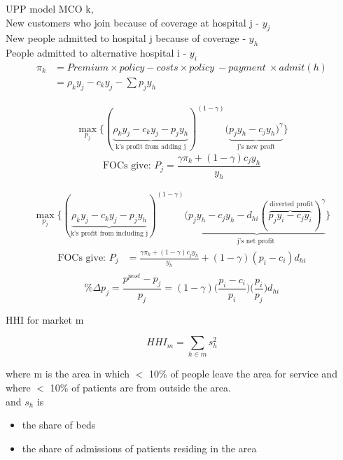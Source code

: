 \documentclass{beamer}
\begin{document}
\begin{frame}{UPP model}
MCO k, \\
New customers who join because of coverage at hospital j - $y_j$ \\
New people admitted to hospital j because of coverage - $y_h$ \\
People admitted to alternative hospital i - $y_i$
\begin{align*}
\pi_k & = Premium \times policy - costs \times policy\  - payment\ \times admit (h) \\
    & = \rho_{k} y_{j} - c_ky_{j} - \sum p_{j} y_{h} 
\end{align*}

\begin{align*}
\max_{p_j} \{ ( \underbrace{ \rho_{k}y_{j} - c_ky_{j} - p_jy_{h}}_{\text{k's profit from adding j}})^{(1-\gamma)}( \underbrace{ p_{j}y_{h}-c_{j}y_{h})^{\gamma} }_{\text{j's new proft}} \}
\end{align*}
\begin{equation*}
\text{FOCs give:    }        P_j = \frac{\gamma \pi_k+(1-\gamma)c_jy_{h}}{y_{h}} 
\end{equation*}
\end{frame}
\begin{frame}

\begin{align*}
    \max_{p_j} \{ ( \underbrace{ \rho_{k}y_{j} - c_ky_{j} - p_jy_{h}}_{\text{k's profit from including j}})^{(1-\gamma)}( \underbrace{ p_{j}y_{h}-c_{j}y_{h} - d_{hi}( \overbrace{p_{j}y_{i}-c_{j}y_{i} }^{\text{ diverted profit}})^{\gamma} }_{\text{j's net profit }} \}
\end{align*}
\begin{align*}
\text{FOCs give:    }        P_j & = \frac{\gamma \pi_k+(1-\gamma)c_jy_{h}} {y_{h}} + (1-\gamma)(p_i - c_i)d_{hi} \\
\end{align*}
$$
\%\Delta p_j = \frac{p^{post} - p_j}{p_j} = (1-\gamma)\bigg( \frac{p_i-c_i}{p_i} \bigg) \bigg( \frac{p_i}{p_j} \bigg) d_{hi}
$$
\end{frame}
\begin{frame}{HHI}
for market m 

$$HHI_m = \sum_{h \in m} s_h^2$$

where m is the area in which $<$ 10\% of people leave the area for service and where $<$ 10\% of patients are from outside the area.\\

and $s_h$ is 
\begin{itemize}
    \item the share of beds
    \item the share of admissions of patients residing in the area
\end{itemize}

\end{frame}
\end{document}
